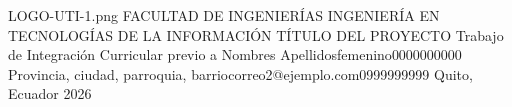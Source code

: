 \documentclass[12pt,a4paper,oneside]{report}
\begin{document}
%
%
%
%
%
%
\UTIPortada
{LOGO-UTI-1.png} %
{FACULTAD DE INGENIERÍAS} %
{INGENIERÍA EN TECNOLOGÍAS DE LA INFORMACIÓN} %
{TÍTULO DEL PROYECTO} %
{Trabajo de Integración Curricular previo a \UTIFraseTituloPortada} %
{\UTIDatosAutores
  {Nombres Apellidos}{femenino}{0000000000}
  {Provincia, ciudad, parroquia, barrio}{correo2@ejemplo.com}{0999999999}}
{} %
{Quito, Ecuador} %
{2026} %
\end{document}
